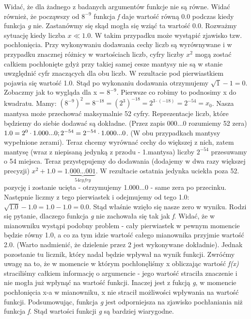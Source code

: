 \documentclass[]{article}
\begin{document}
	Widać, że dla żadnego z badanych argumentów funkcje nie są równe. Widać również, że począwszy od \(8^{-9}\) funkcja \textit{f} daje wartość równą 0.0 podczas kiedy funkcja \textit{g} nie. Zastanówmy się skąd mogła się wziąć ta wartość 0.0. Rozważmy sytuację kiedy liczba $x \ll 1.0$. W takim przypadku może wystąpić zjawisko tzw. pochłonięcia. Przy wykonywaniu dodawania cechy liczb są wyrównywane i w przypadku znacznej różnicy w wartościach liczb, cyfry liczby $x^2$ mogą zostać całkiem pochłonięte gdyż przy takiej samej cesze mantysy nie są w stanie uwzględnić cyfr znaczących dla obu liczb. W rezultacie pod pierwiastkiem pojawia się wartość 1.0. Stąd po wykonaniu dodawania otrzymujemy \(\sqrt{1} - 1 = 0\).\newline
	Zobaczmy jak to wygląda dla x = \(8^{-9}\). Pierwsze co robimy to podnosimy x do kwadratu. Mamy:
	 \(({8^{-9}})^2 = 8^{-18} = ({2^3})^{-18} = 2^{3 \cdot (-18)} = 2^{-54} = x_0\). Nasza mantysa może przechować maksymalnie 52 cyfry. Reprezentacje liczb, które będziemy do siebie dodawać są dokładne. (Przez zapis 000...0 rozumiemy 52 zera)
	 \(1.0 = 2^0 \cdot 1.000...0;\space\space2^{-54} = 2^{-54} \cdot 1.000...0\). (W obu przypadkach mantysy wypełnione zerami). Teraz chcemy wyrównać cechy do większej z nich, zatem mantysę (wraz z niepisaną jedynką z przodu - 1.mantysa) liczby $2^{-54}$ przesuwamy o 54 miejsca. Teraz przystępujemy do dodawania (dodajemy w dwa razy większej precyzji) $x^2 + 1.0 = 1.\underbrace{000...001}_{54 cyfry}$.
	 W rezultacie ostatnia jedynka uciekła poza 52. pozycję i zostanie ucięta - otrzymujemy 1.000...0 - same zera po przecinku. Następnie liczmy z tego pierwiastek i odejmujemy od tego 1.0: \(\sqrt{1.0} - 1.0 = 1.0 - 1.0 = 0.0\). Stąd właśnie wzięło się nasze zero w wyniku.\newline
	 Rodzi się pytanie, dlaczego funkcja \textit{g} nie zachowała się tak jak \textit{f}. Widać, że w mianowniku wystąpi podobny problem - cały pierwiastek w pewnym momencie będzie równy 1.0, a co za tym idzie wartość całego mianownika przyjmie wartość 2.0. (Warto nadmienić, że dzielenie przez 2 jest wykonywane dokładnie). Jednak pozostanie tu licznik, który nadal będzie wpływał na wynik funkcji. Zwróćmy uwagę na to, że w momencie w którym pochłonęliśmy x obliczając wartość \textit{f(x)} straciliśmy całkiem informację o argumencie - jego wartość straciła znaczenie i nie mogła już wpłynąć na wartość funkcji. Inaczej jest z fukcją \textit{g}, w momencie pochłonięcia x-a w mianowniku, x nie stracił możliwości wpływania na wartość funkcji. Podsumowując, funkcja \textit{g} jest odporniejsza na zjawisko pochłaniania niż funkcja \textit{f}. Stąd wartości funkcji \textit{g} są bardziej wiarygodne.
	\clearpage
\end{document}
